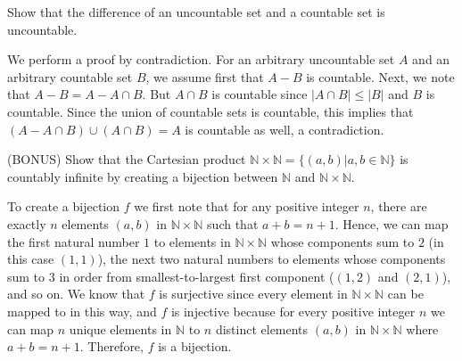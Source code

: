 \documentclass[solution, letterpaper]{cs20inclass}
\begin{document}
\problem Show that the difference of an uncountable set and a countable set is uncountable.

\begin{solution}
We perform a proof by contradiction. For an arbitrary uncountable set $A$ and an arbitrary
countable set $B$, we assume first that $A - B$ is countable. Next, we note that $A - B = A - A \cap B$. But $A \cap B$ is countable since $|A \cap B| \leq |B|$ and $B$ is countable. Since the union of countable sets is countable, this implies that $(A - A \cap B) \cup (A \cap B) = A$ is countable as well, a contradiction.
\end{solution}

\problem (BONUS) Show that the Cartesian product $\mathbb{N} \times \mathbb{N} = \{(a,b)|a,b \in \mathbb{N}\}$ is countably infinite by creating a bijection between $\mathbb{N}$ and $\mathbb{N} \times \mathbb{N}$.

\begin{solution}
To create a bijection $f$ we first note that for any positive integer $n$, there are exactly $n$ elements $(a,b)$ in $\mathbb{N} \times \mathbb{N} $ such that $a + b = n + 1$. Hence, we can map the first natural number $1$ to elements in $\mathbb{N} \times \mathbb{N} $ whose components sum to $2$ (in this case $(1,1)$), the next two natural numbers to elements whose components sum to $3$ in order from smallest-to-largest first component ($(1,2)$ and $(2,1)$), and so on. We know that $f$ is surjective since every element in $\mathbb{N} \times \mathbb{N} $ can be mapped to in this way, and $f$ is injective because for every positive integer $n$ we can map $n$ unique elements in $\mathbb{N}$ to $n$ distinct elements $(a,b)$ in $\mathbb{N} \times \mathbb{N} $ where $a + b = n + 1$. Therefore, $f$ is a bijection.
\end{solution}
\end{document}
